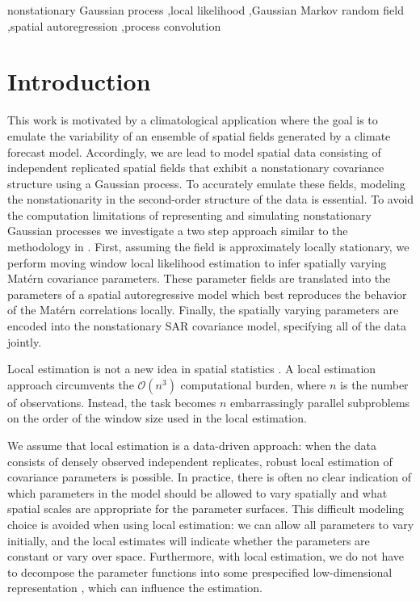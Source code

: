 \documentclass[review]{elsarticle}
\begin{document}
\begin{frontmatter}
\begin{abstract}
\end{abstract}

\begin{keyword}
nonstationary Gaussian process \sep local likelihood \sep Gaussian Markov random field \sep spatial autoregression \sep process convolution
\end{keyword}

\end{frontmatter}

\linenumbers

\section{Introduction}

This work is motivated by a climatological application where the goal is to emulate the variability of an ensemble of spatial fields generated by a climate forecast model. Accordingly, we are lead to model spatial data consisting of independent replicated spatial fields that exhibit a nonstationary covariance structure using a Gaussian process. To accurately emulate these fields, modeling the nonstationarity in the second-order structure of the data is essential. 
To avoid the computation limitations of representing and simulating nonstationary Gaussian processes we investigate a two step approach similar to the methodology in \cite{nychka2018modeling}. First, assuming the field is approximately locally stationary, we perform moving window local likelihood estimation to infer spatially varying Mat\'ern covariance parameters. These parameter fields are translated into the  parameters  of a spatial autoregressive  model which best reproduces the behavior of the Mat\'ern correlations locally. Finally, the spatially varying parameters are encoded into the nonstationary SAR covariance model, specifying all of the data jointly.

Local estimation is not a new idea in spatial statistics \cite{haas1990kriging, haas1990lognormal, ver2004flexible, risser2015local}. A local estimation approach circumvents the $\mathcal{O}(n^3)$ computational burden, where $n$ is the number of observations. Instead, the task becomes $n$ embarrassingly parallel subproblems on the order of the window size used in the local estimation. 

We assume that local estimation is a data-driven approach: when the data consists of densely observed independent replicates, robust local estimation of covariance parameters is possible. In practice, there is often no clear indication of which parameters in the model should be allowed to vary spatially \cite{fuglstad2015does} and what spatial scales are appropriate for the parameter surfaces. This difficult modeling choice is avoided when using local estimation: we can allow all parameters to vary initially, and the local estimates will indicate whether the parameters are constant or vary over space. Furthermore, with local estimation, we do not have to decompose the parameter functions into some prespecified low-dimensional representation \cite{fuglstad2015exploring, risser2016nonstationary}, which can influence the estimation. 
\end{document}
